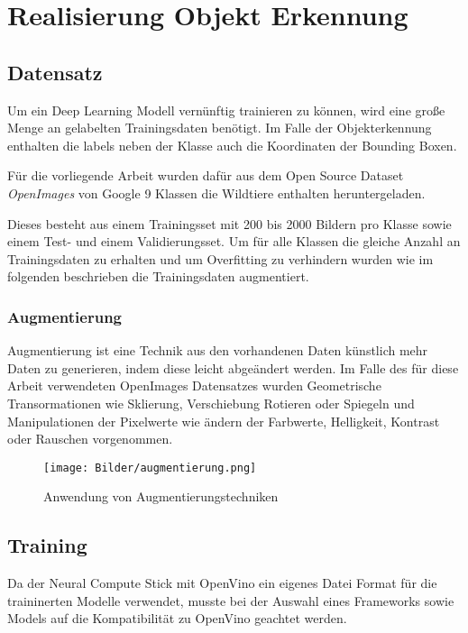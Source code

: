 \chapter{Realisierung Objekt Erkennung}\label{kap:object_det}

\section{Datensatz}\label{sec:dataset}

Um ein Deep Learning Modell vernünftig trainieren zu können, 
wird eine große Menge an gelabelten Trainingsdaten benötigt.
Im Falle der Objekterkennung enthalten die labels neben der 
Klasse auch die Koordinaten der Bounding Boxen.


Für die vorliegende Arbeit wurden dafür aus dem Open Source 
Dataset \textit{OpenImages} \cite{kuznetsovaOpenImagesDataset2018} 
von Google 9 Klassen die Wildtiere enthalten heruntergeladen.

Dieses besteht aus einem Trainingsset mit 200 bis 2000 Bildern pro 
Klasse sowie einem Test- und einem Validierungsset. Um für alle Klassen 
die gleiche Anzahl an Trainingsdaten zu erhalten und um Overfitting zu 
verhindern wurden wie im folgenden beschrieben die Trainingsdaten 
augmentiert.

\subsection{Augmentierung}

Augmentierung ist eine Technik aus den vorhandenen Daten 
künstlich mehr Daten zu generieren, indem diese leicht 
abgeändert werden. Im Falle des für diese Arbeit verwendeten
OpenImages Datensatzes wurden Geometrische Transormationen 
wie Sklierung, Verschiebung Rotieren oder Spiegeln und 
Manipulationen der Pixelwerte wie ändern der 
Farbwerte, Helligkeit, Kontrast oder Rauschen vorgenommen.

\begin{figure}[htb]
    \centering
    \label{fig:augmentierung}
    \texttt{[image: Bilder/augmentierung.png]}
    \caption{Anwendung von Augmentierungstechniken}
\end{figure}


\section{Training}

Da der Neural Compute Stick mit OpenVino ein eigenes Datei Format 
für die traininerten Modelle verwendet, musste bei der Auswahl
eines Frameworks sowie Models auf die Kompatibilität zu OpenVino 
geachtet werden. 

